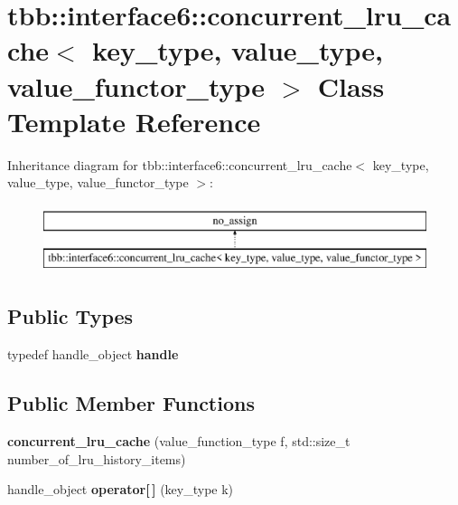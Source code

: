 \hypertarget{classtbb_1_1interface6_1_1concurrent__lru__cache}{}\section{tbb\+:\+:interface6\+:\+:concurrent\+\_\+lru\+\_\+cache$<$ key\+\_\+type, value\+\_\+type, value\+\_\+functor\+\_\+type $>$ Class Template Reference}
\label{classtbb_1_1interface6_1_1concurrent__lru__cache}
Inheritance diagram for tbb\+:\+:interface6\+:\+:concurrent\+\_\+lru\+\_\+cache$<$ key\+\_\+type, value\+\_\+type, value\+\_\+functor\+\_\+type $>$\+:\begin{figure}[H]
\begin{center}
\leavevmode
\includegraphics[height=2.000000cm]{classtbb_1_1interface6_1_1concurrent__lru__cache}
\end{center}
\end{figure}
\subsection*{Public Types}
\begin{DoxyCompactItemize}
\item 
\hypertarget{classtbb_1_1interface6_1_1concurrent__lru__cache_ac498dc4d73a75cbc0d50a15622f06e13}{}typedef handle\+\_\+object {\bfseries handle}\label{classtbb_1_1interface6_1_1concurrent__lru__cache_ac498dc4d73a75cbc0d50a15622f06e13}

\end{DoxyCompactItemize}
\subsection*{Public Member Functions}
\begin{DoxyCompactItemize}
\item 
\hypertarget{classtbb_1_1interface6_1_1concurrent__lru__cache_ad4c0b512bb4ad5109eaae1519ba06d98}{}{\bfseries concurrent\+\_\+lru\+\_\+cache} (value\+\_\+function\+\_\+type f, std\+::size\+\_\+t number\+\_\+of\+\_\+lru\+\_\+history\+\_\+items)\label{classtbb_1_1interface6_1_1concurrent__lru__cache_ad4c0b512bb4ad5109eaae1519ba06d98}

\item 
\hypertarget{classtbb_1_1interface6_1_1concurrent__lru__cache_a632c3911a55cfda997acce279c471ec3}{}handle\+\_\+object {\bfseries operator\mbox{[}$\,$\mbox{]}} (key\+\_\+type k)\label{classtbb_1_1interface6_1_1concurrent__lru__cache_a632c3911a55cfda997acce279c471ec3}

\end{DoxyCompactItemize}
